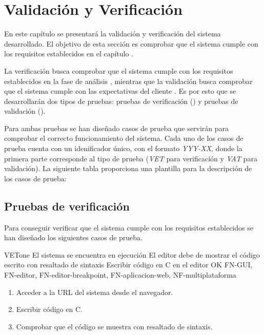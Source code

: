 \chapter{Validación y Verificación}\label{chap:validacion}

En este capítulo se presentará la validación y verificación del sistema desarrollado. El objetivo de esta sección es comprobar que el sistema cumple con los requisitos establecidos en el capítulo . 

La verificación busca comprobar que el sistema cumple con los requisitos establecidos en la fase de análisis \cite{IEEE-Validation-Verification}, mientras que la validación busca comprobar que el sistema cumple con las expectativas del cliente \cite{IEEE-Validation-Verification}. 
Es por esto que se desarrollarán dos tipos de pruebas: pruebas de verificación () y pruebas de validación (). 

Para ambas pruebas se han diseñado casos de prueba que servirán para comprobar el correcto funcionamiento del sistema. Cada uno de los casos de prueba cuenta con un idenificador único, con el formato \textit{YYY-XX}, donde la primera parte corresponde al tipo de prueba (\textit{VET} para verificación y \textit{VAT} para validación). La siguiente tabla proporciona una plantilla para la descripción de los casos de prueba:

\printtesttemplate

\section{Pruebas de verificación}\label{sec:verificacion}

Para conseguir verificar que el sistema cumple con los requisitos establecidos se han diseñado los siguientes casos de prueba.

    \begin{testCase}{VET}{one}
    {El sistema se encuentra en ejecución}
    {El editor debe de mostrar el código escrito con resaltado de sintaxis}
    {Escribir código en C en el editor}
    {OK}
    {FN-GUI, FN-editor, FN-editor-breakpoint, FN-aplicacion-web, NF-multiplataforma}
    \begin{enumerate}
        \item Acceder a la URL del sistema desde el navegador.
        \item Escribir código en C.
        \item Comprobar que el código se muestra con resaltado de sintaxis.
    \end{enumerate}
    \end{testCase}

